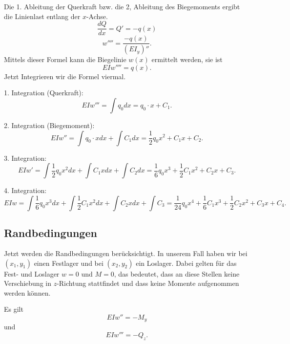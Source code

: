 Die 1. Ableitung der Querkraft bzw. die 2, Ableitung des Biegemoments ergibt die Linienlast entlang der $x$-Achse.
\begin{equation}
	\frac{dQ}{dx}=
	Q'=
	-q(x)
\end{equation}
\begin{equation}
	w''''=
	\frac{-q(x)}{(EI_y)''}.
\end{equation}
Mittels dieser Formel kann die Biegelinie $w(x)$ ermittelt werden, sie ist
\begin{equation}
	EIw''''=
	q\left(x\right).
\end{equation}
Jetzt Integrieren wir die Formel viermal.

1. Integration (Querkraft):
\begin{equation}
	EIw'''=
	\int q_0dx=
	q_0\cdot x+C_1.
\end{equation}

2. Integration (Biegemoment):
\begin{equation}
	EIw''=
	\int{q_0\cdot x}dx+\int C_1dx=
	\frac{1}{2}q_0x^2+C_1x+C_2.
\end{equation}

3. Integration:
\begin{equation}
	EIw'=
	\int{\frac{1}{2}q_0x^2}dx+\int{C_1x}dx+\int C_2dx=
	\frac{1}{6}q_0x^3+\frac{1}{2}C_1x^2+C_2x+C_3.
\end{equation}

4. Integration:
\begin{equation}
	EIw=
	\int{\frac{1}{6}q_0x^3}dx+\int{\frac{1}{2}C_1x^2}dx+\int{C_2x}dx+\int C_3=
	\frac{1}{24}q_0x^4+\frac{1}{6}C_1x^3+\frac{1}{2}C_2x^2+C_3x+C_4.
\end{equation}

\subsection{Randbedingungen}
Jetzt werden die Randbedingungen berücksichtigt.
In unserem Fall haben wir bei $(x_1, y_1)$ einen Festlager und bei $(x_2, y_2)$ ein Loslager.
Dabei gelten für das Fest- und Loslager $w = 0$ und $M = 0$, das bedeutet, dass an diese Stellen keine Verschiebung in $z$-Richtung stattfindet und dass keine Momente aufgenommen werden können.

Es gilt
\begin{equation}
	EIw'' =
	-M_y
\end{equation}
und
\begin{equation}
	EIw'''=
	-Q_z.
\end{equation}

